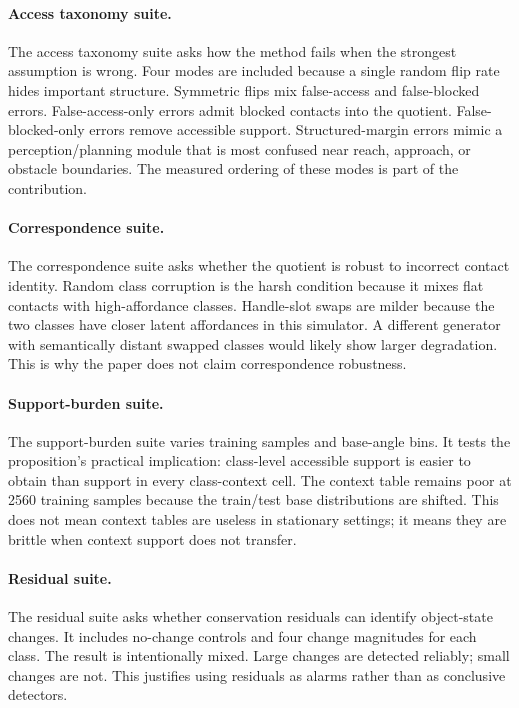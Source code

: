 \documentclass{article}
\begin{document}
\paragraph{Access taxonomy suite.}
The access taxonomy suite asks how the method fails when the strongest assumption is wrong. Four modes are included because a single random flip rate hides important structure. Symmetric flips mix false-access and false-blocked errors. False-access-only errors admit blocked contacts into the quotient. False-blocked-only errors remove accessible support. Structured-margin errors mimic a perception/planning module that is most confused near reach, approach, or obstacle boundaries. The measured ordering of these modes is part of the contribution.

\paragraph{Correspondence suite.}
The correspondence suite asks whether the quotient is robust to incorrect contact identity. Random class corruption is the harsh condition because it mixes flat contacts with high-affordance classes. Handle-slot swaps are milder because the two classes have closer latent affordances in this simulator. A different generator with semantically distant swapped classes would likely show larger degradation. This is why the paper does not claim correspondence robustness.

\paragraph{Support-burden suite.}
The support-burden suite varies training samples and base-angle bins. It tests the proposition's practical implication: class-level accessible support is easier to obtain than support in every class-context cell. The context table remains poor at 2560 training samples because the train/test base distributions are shifted. This does not mean context tables are useless in stationary settings; it means they are brittle when context support does not transfer.

\paragraph{Residual suite.}
The residual suite asks whether conservation residuals can identify object-state changes. It includes no-change controls and four change magnitudes for each class. The result is intentionally mixed. Large changes are detected reliably; small changes are not. This justifies using residuals as alarms rather than as conclusive detectors.
\end{document}
